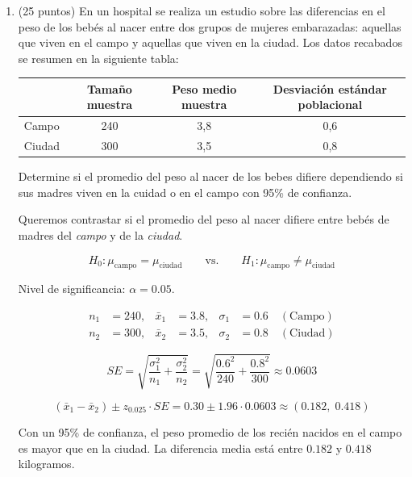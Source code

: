 \documentclass[10pt,a4paper]{article}
\begin{document}
\begin{enumerate}
    \item (25 puntos) En un hospital se realiza un estudio sobre las diferencias  en el peso de los bebés al nacer entre dos grupos de mujeres embarazadas: aquellas que viven en el campo y aquellas que viven en la ciudad. Los datos recabados  se resumen en la siguiente tabla:

\begin{center}
    \begin{tabular}{| l| c | c| c|}
\hline
& Tamaño muestra& Peso medio muestra & Desviación estándar poblacional \\ \hline
Campo &240 &3,8&0,6 \\
Ciudad & 300& 3,5& 0,8\\ \hline
\end{tabular}
\end{center}

Determine si el promedio del peso al nacer de los bebes difiere dependiendo si sus madres  viven en la cuidad o en el campo con 95\% de confianza.

{\color{blue}  
Queremos contrastar si el promedio del peso al nacer difiere entre bebés de madres del \textit{campo} y de la \textit{ciudad}.

\[
H_0: \mu_{\text{campo}} = \mu_{\text{ciudad}} 
\qquad \text{vs.} \qquad 
H_1: \mu_{\text{campo}} \neq \mu_{\text{ciudad}}
\]

Nivel de significancia: \(\alpha = 0.05\).


\[
\begin{aligned}
n_1 &= 240, & \bar x_1 &= 3.8, & \sigma_1 &= 0.6 \quad (\text{Campo}) \\
n_2 &= 300, & \bar x_2 &= 3.5, & \sigma_2 &= 0.8 \quad (\text{Ciudad})
\end{aligned}
\]


\[
SE = \sqrt{\frac{\sigma_1^2}{n_1} + \frac{\sigma_2^2}{n_2}}
= \sqrt{\frac{0.6^2}{240} + \frac{0.8^2}{300}}
\approx 0.0603
\]


  


\[
(\bar x_1 - \bar x_2) \pm z_{0.025}\cdot SE
= 0.30 \pm 1.96 \cdot 0.0603
\approx (0.182,\; 0.418)
\]


Con un 95\% de confianza, el peso promedio de los recién nacidos en el campo es mayor que en la ciudad. La diferencia media está entre \(0.182\) y \(0.418\) kilogramos.
}


\end{enumerate}
\end{document}
